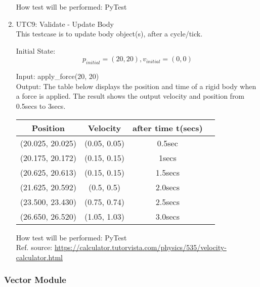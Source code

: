 \documentclass[12pt, titlepage]{article}
\begin{document}
\begin{enumerate}
How test will be performed: PyTest\\

\item{UTC9}{: Validate - Update Body\\}
This testcase is to update body object(s), after a cycle/tick.

Initial State: \[p_{initial} = (20,20), v_{initial} = (0, 0)\]
            
Input: apply\_force(20, 20)\\
Output: The table below displays the position and time of a rigid body when a force is applied. The result shows the output velocity and position from 0.5secs to 3secs.
\begin{table} [h!]
	
	\centering
	
	\begin{tabular}{|c|c|c|c}
		
		\hline	
		
	\textbf{Position} &\textbf{Velocity} & \textbf{after time t(secs)}\\
	\hline 

	\hline(20.025, 20.025)& (0.05, 0.05)& 0.5sec \\ \hline
		
    (20.175, 20.172)& (0.15, 0.15)& 1secs \\ \hline
		
	(20.625, 20.613)& (0.15, 0.15)& 1.5secs \\ \hline
		
    (21.625, 20.592)& (0.5, 0.5)& 2.0secs \\ \hline
		
	(23.500, 23.430)& (0.75, 0.74)& 2.5secs \\ \hline
	
	(26.650, 26.520)& (1.05, 1.03)& 3.0secs \\ \hline
		
	\end{tabular}
	
	
\end{table}
How test will be performed: PyTest\\

Ref. source: \url{https://calculator.tutorvista.com/physics/535/velocity-calculator.html}


\end{enumerate}

\subsubsection{Vector Module}
\end{document}

